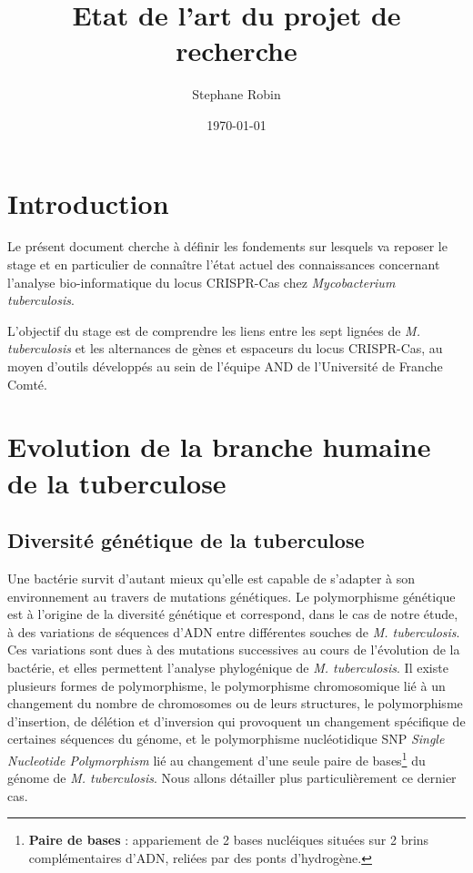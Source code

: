 \documentclass[twoside,a4paper,11pt,frenchb,openany]{report}
\title{Etat de l'art du projet de recherche}
\author{Stephane Robin}
\date{\today}
\begin{document}
\maketitle

\tableofcontents

\section{Introduction}

Le présent document cherche à définir les fondements sur lesquels va reposer le stage et en particulier de connaître l'état actuel des connaissances concernant l'analyse bio-informatique du locus CRISPR-Cas chez \textit{Mycobacterium tuberculosis}.

L'objectif du stage est de comprendre les liens entre les sept lignées de \textit{M. tuberculosis} et les alternances de gènes et espaceurs du locus CRISPR-Cas, au moyen d'outils développés au sein de l'équipe AND de l'Université de Franche Comté.



\section{Evolution de la branche humaine de la tuberculose}


\subsection{Diversité génétique de la tuberculose}

Une bactérie survit d'autant mieux qu'elle est capable de s'adapter à son environnement au travers de mutations génétiques. Le polymorphisme génétique est à l'origine de la diversité génétique et correspond, dans le cas de notre étude, à des variations de séquences d'ADN entre différentes souches de \textit{M. tuberculosis}. Ces variations sont dues à des mutations successives au cours de l'évolution de la bactérie, et elles permettent l'analyse phylogénique de \textit{M. tuberculosis}. Il existe plusieurs formes de polymorphisme, le polymorphisme chromosomique lié à un changement du nombre de chromosomes ou de leurs structures, le polymorphisme d'insertion, de délétion et d'inversion qui provoquent un changement spécifique de certaines séquences du génome, et le polymorphisme nucléotidique SNP \textit{Single Nucleotide Polymorphism} lié au changement d'une seule paire de bases\footnote{\textbf{Paire de bases} : appariement de 2 bases nucléiques situées sur 2 brins complémentaires d'ADN, reliées par des ponts d'hydrogène.} du génome de \textit{M. tuberculosis}. Nous allons détailler plus particulièrement ce dernier cas.
\end{document}
